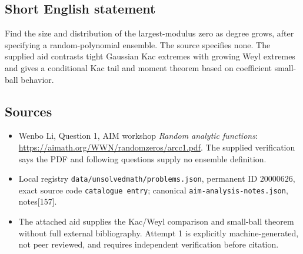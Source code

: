 \documentclass[11pt]{article}
\begin{document}
\subsection{Short English statement}
Find the size and distribution of the largest-modulus zero as degree grows, after specifying a random-polynomial ensemble. The source specifies none. The supplied aid contrasts tight Gaussian Kac extremes with growing Weyl extremes and gives a conditional Kac tail and moment theorem based on coefficient small-ball behavior.
\subsection{Sources}
\begin{itemize}
\item Wenbo Li, Question 1, AIM workshop \emph{Random analytic functions}: \url{https://aimath.org/WWN/randomzeros/arcc1.pdf}. The supplied verification says the PDF and following questions supply no ensemble definition.
\item Local registry \texttt{data/unsolvedmath/problems.json}, permanent ID \(20000626\), exact source code \texttt{catalogue entry}; canonical \texttt{aim-analysis-notes.json}, notes[157].
\item The attached aid supplies the Kac/Weyl comparison and small-ball theorem without full external bibliography. Attempt 1 is explicitly machine-generated, not peer reviewed, and requires independent verification before citation.
\end{itemize}
\end{document}
